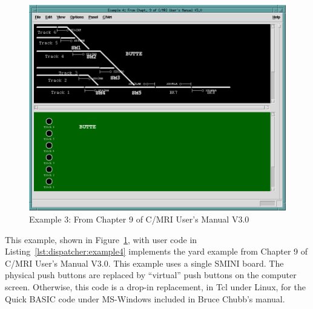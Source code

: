 \begin{figure}[hbpt]
\begin{centering}
\includegraphics[width=5in]{DISPExample4.png}
\caption{Example 3: From Chapter 9 of C/MRI User's Manual V3.0}
\label{fig:dispatcher:example4}
\end{centering}
\end{figure}


This example, shown in Figure~\ref{fig:dispatcher:example4}, with user
code in Listing~\ref{lst:dispatcher:example4} implements the yard
example from Chapter 9 of C/MRI User's Manual V3.0\cite{Chubb03}.  This
example uses a single SMINI board.  The physical push buttons are
replaced by ``virtual'' push buttons on the computer screen.  Otherwise,
this code is a drop-in replacement, in Tcl under Linux, for the Quick
BASIC code under MS-Windows included in Bruce Chubb's manual.

